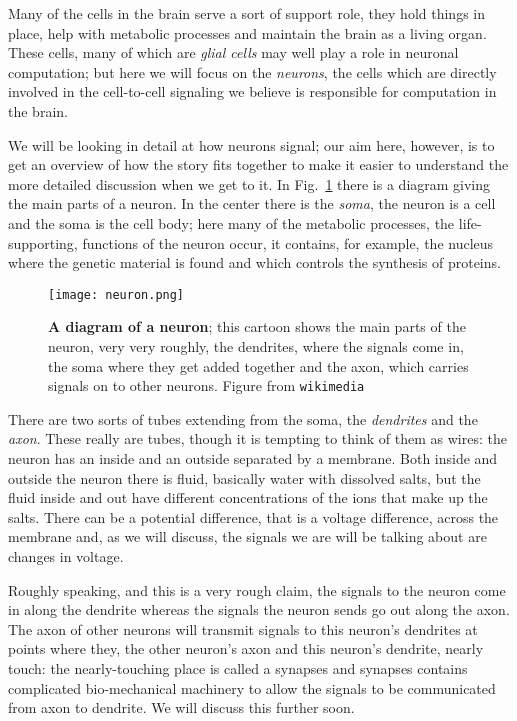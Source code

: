 \documentclass[12pt]{article}
\begin{document}
Many of the cells in the brain serve a sort of support role, they hold
things in place, help with metabolic processes and maintain the brain
as a living organ. These cells, many of which are \textsl{glial cells}
may well play a role in neuronal computation; but here we will focus
on the \textsl{neurons}, the cells which are directly involved in the
cell-to-cell signaling we believe is responsible for computation in
the brain.

We will be looking in detail at how neurons signal; our aim here,
however, is to get an overview of how the story fits together to make
it easier to understand the more detailed discussion when we get to
it. In Fig.~\ref{fig_neuron} there is a diagram giving the main parts
of a neuron. In the center there is the \textsl{soma}, the neuron is a
cell and the soma is the cell body; here many of the metabolic
processes, the life-supporting, functions of the neuron occur, it
contains, for example, the nucleus where the genetic material is found
and which controls the synthesis of proteins. 

\begin{figure}[tbhp]
  \begin{center}
    \texttt{[image: neuron.png]}
    \end{center}
  \caption{\textbf{A diagram of a neuron}; this cartoon shows the main parts of the neuron, very very roughly, the dendrites, where the signals come in, the soma where they get added together and the axon, which carries signals on to other neurons. Figure from \texttt{wikimedia}\label{fig_neuron}}
\end{figure}

There are two sorts of tubes extending from the soma, the
\textsl{dendrites} and the \textsl{axon}. These really are tubes,
though it is tempting to think of them as wires: the neuron has an
inside and an outside separated by a membrane. Both inside and outside
the neuron there is fluid, basically water with dissolved salts, but
the fluid inside and out have different concentrations of the ions
that make up the salts. There can be a potential difference, that is a
voltage difference, across the membrane and, as we will discuss, the
signals we are will be talking about are changes in voltage.

Roughly speaking, and this is a very rough claim, the signals to the
neuron come in along the dendrite whereas the signals the neuron sends
go out along the axon. The axon of other neurons will transmit signals
to this neuron's dendrites at points where they, the other neuron's
axon and this neuron's dendrite, nearly touch: the nearly-touching
place is called a synapses and synapses contains complicated
bio-mechanical machinery to allow the signals to be communicated from
axon to dendrite. We will discuss this further soon.
\end{document}
